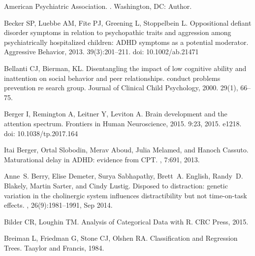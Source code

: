 \documentclass[10pt,letterpaper]{article}
\begin{document}
\begin{thebibliography}{10}

American Psychiatric Association. 
. 
\newblock Washington, DC: Author.

Becker SP, Luebbe AM, Fite PJ, Greening L,
  Stoppelbein L.
\newblock Oppositional defiant disorder symptoms in relation to psychopathic
  traits and aggression among psychiatrically hospitalized children: {ADHD}
  symptoms as a potential moderator.
\newblock Aggressive Behavior, 2013. 39(3):201--211. doi: 10.1002/ab.21471

Bellanti CJ, Bierman, KL.
\newblock Disentangling the impact of low cognitive ability and inattention on
  social behavior and peer relationships. conduct problems prevention re search
  group.
\newblock Journal of Clinical Child Psychology, 2000. 29(1), 66--75.

Berger I, Remington A, Leitner Y, Leviton A.
\newblock Brain development and the attention spectrum.
\newblock Frontiers in Human Neuroscience, 2015. 9:23, 2015. e1218. doi: 10.1038/tp.2017.164

Itai Berger, Ortal Slobodin, Merav Aboud, Julia Melamed, and Hanoch Cassuto.
\newblock Maturational delay in {ADHD}: evidence from {CPT}.
, 7:691, 2013.

Anne~S. Berry, Elise Demeter, Surya Sabhapathy, Brett~A. English, Randy~D.
  Blakely, Martin Sarter, and Cindy Lustig.
\newblock Disposed to distraction: genetic variation in the cholinergic system
  influences distractibility but not time-on-task effects.
, 26(9):1981--1991, Sep 2014.


Bilder CR,  Loughin TM.
\newblock Analysis of Categorical Data with R.
\newblock CRC Press, 2015.

Breiman L, Friedman G, Stone CJ, Olshen RA.
\newblock Classification and Regression Trees.
\newblock Taaylor and Francis, 1984.


\end{thebibliography}
\end{document}
